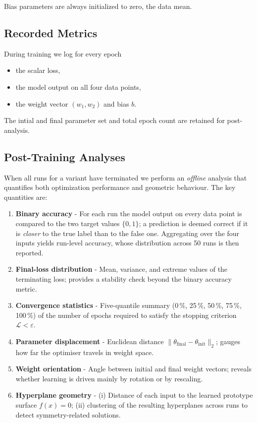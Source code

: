 Bias parameters are always initialized to zero, the data mean.

\subsection*{Recorded Metrics}

During training we log for every epoch
\begin{itemize}
  \item the scalar loss,
  \item the model output on all four data points,
  \item the weight vector \((w_1,w_2)\) and bias \(b\).
\end{itemize}
The intial and final parameter set and total epoch count are retained for post-analysis.

\subsection*{Post-Training Analyses}

When all runs for a variant have terminated we perform an \emph{offline}
analysis that quantifies both optimization performance and geometric
behaviour.  The key quantities are:

\begin{enumerate}[label=(A\arabic*)]
    \item \textbf{Binary accuracy} -  
          For each run the model output on every data point is compared to the
          two target values \(\{0,1\}\); a prediction is deemed correct if it
          is \emph{closer} to the true label than to the false one.
          Aggregating over the four inputs yields run-level accuracy, whose
          distribution across 50 runs is then reported.
    \item \textbf{Final-loss distribution} -  
          Mean, variance, and extreme values of the terminating loss; provides
          a stability check beyond the binary accuracy metric.
    \item \textbf{Convergence statistics} -  
          Five-quantile summary (0\,\%, 25\,\%, 50\,\%, 75\,\%, 100\,\%) of
          the number of epochs required to satisfy the stopping criterion
          \(\mathcal{L}<\varepsilon\).
    \item \textbf{Parameter displacement} -  
          Euclidean distance
          \(\lVert\theta_{\text{final}}-\theta_{\text{init}}\rVert_2\); gauges
          how far the optimiser travels in weight space.
    \item \textbf{Weight orientation} -  
          Angle between initial and final weight vectors; reveals whether
          learning is driven mainly by rotation or by rescaling.
    \item \textbf{Hyperplane geometry} -  
          (i) Distance of each input to the learned prototype surface
          \(f(x)=0\);  
          (ii) clustering of the resulting hyperplanes across runs to detect
          symmetry-related solutions.
\end{enumerate}

